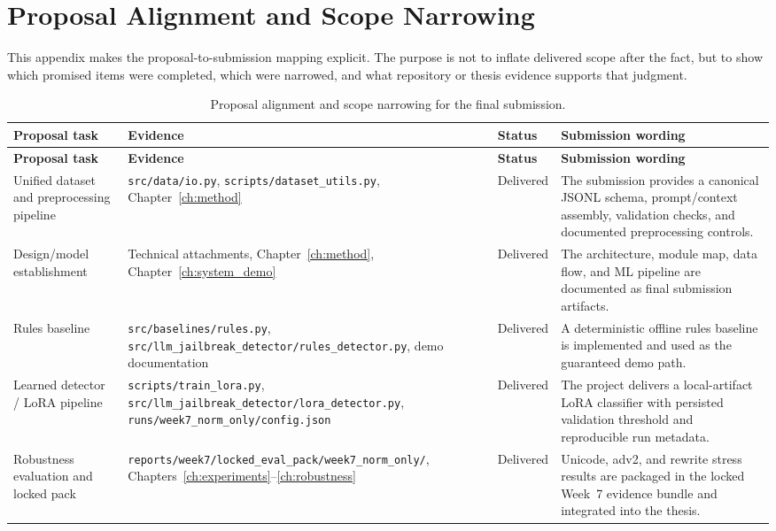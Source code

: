 \chapter{Proposal Alignment and Scope Narrowing}
\label{app:proposal_alignment}

This appendix makes the proposal-to-submission mapping explicit. The purpose is not to inflate delivered scope after the fact, but to show which promised items were completed, which were narrowed, and what repository or thesis evidence supports that judgment.

\small
\setlength{\LTleft}{0pt}
\setlength{\LTright}{0pt}
\begin{longtable}{p{}p{}p{}p{}}
\caption{Proposal alignment and scope narrowing for the final submission.}\label{tab:proposal_alignment}\\
\toprule
\textbf{Proposal task} & \textbf{Evidence} & \textbf{Status} & \textbf{Submission wording} \\
\midrule
\endfirsthead
\toprule
\textbf{Proposal task} & \textbf{Evidence} & \textbf{Status} & \textbf{Submission wording} \\
\midrule
\endhead
\bottomrule
\endfoot
Unified dataset and preprocessing pipeline & \texttt{src/data/io.py}, \texttt{scripts/dataset\_utils.py}, Chapter~\ref{ch:method} & Delivered & The submission provides a canonical JSONL schema, prompt/context assembly, validation checks, and documented preprocessing controls. \\
Design/model establishment & Technical attachments, Chapter~\ref{ch:method}, Chapter~\ref{ch:system_demo} & Delivered & The architecture, module map, data flow, and ML pipeline are documented as final submission artifacts. \\
Rules baseline & \texttt{src/baselines/rules.py}, \texttt{src/llm\_jailbreak\_detector/rules\_detector.py}, demo documentation & Delivered & A deterministic offline rules baseline is implemented and used as the guaranteed demo path. \\
Learned detector / LoRA pipeline & \texttt{scripts/train\_lora.py}, \texttt{src/llm\_jailbreak\_detector/lora\_detector.py}, \texttt{runs/week7\_norm\_only/config.json} & Delivered & The project delivers a local-artifact LoRA classifier with persisted validation threshold and reproducible run metadata. \\
Robustness evaluation and locked pack & \texttt{reports/week7/locked\_eval\_pack/week7\_norm\_only/}, Chapters~\ref{ch:experiments}--\ref{ch:robustness} & Delivered & Unicode, adv2, and rewrite stress results are packaged in the locked Week~7 evidence bundle and integrated into the thesis. \\

\end{longtable}
